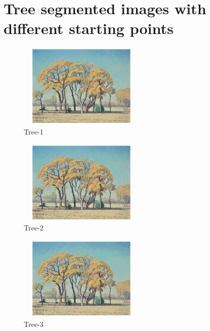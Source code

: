 \documentclass[a4paper, 11pt]{article}
\begin{document}
\section{Tree segmented images with different starting points}
\begin{figure}[h!]
\centering
    \includegraphics[width=6cm, height=4cm]{images/Tree_20.jpeg}
    \caption{Tree-1}
\end{figure}
\begin{figure}[h!]
\centering
    \includegraphics[width=6cm, height=4cm]{images/Tree_20_1.jpeg}
    \caption{Tree-2}
\end{figure}
\begin{figure}[h!]
\centering
    \includegraphics[width=6cm, height=4cm]{images/Tree_20_2.jpeg}
    \caption{Tree-3}
\end{figure}
\end{document}
